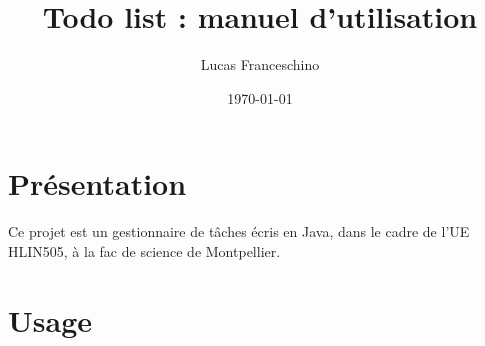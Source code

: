 \documentclass{article}
\title{Todo list : manuel d'utilisation}
\date{\today}
\author{Lucas Franceschino}
\begin{document}
	\maketitle

	\tableofcontents

	\newpage

	\section{Présentation}
	Ce projet est un gestionnaire de tâches écris en Java, dans le cadre de l'UE HLIN505, à la fac de science de Montpellier.\\

	\section{Usage}
\end{document}
